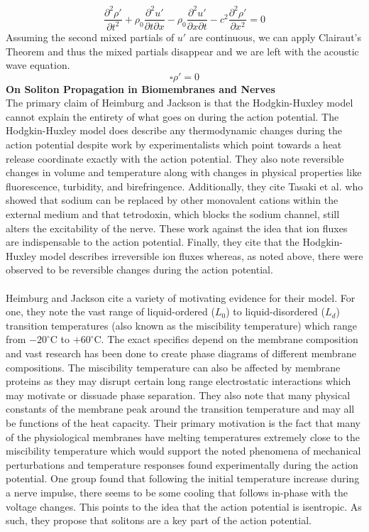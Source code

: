 \documentclass{article}
\newcommand{\pdt}[2]{\frac{\partial ^2 #1}{\partial #2 ^2}}
\newcommand{\pdm}[3]{\frac{\partial^2 #1}{\partial#2 \partial #3}}
\numberwithin{equation}{section}
\begin{document}
\begin{equation}
    \pdt{\rho'}{t} + \rho_0 \pdm{u'}{t}{x} - \rho_0 \pdm{u'}{x}{t} -c^2 \pdt{\rho ' }{x} = 0
\end{equation}
Assuming the second mixed partials of $u'$ are continuous, we can apply Clairaut's Theorem and thus the mixed partials disappear and we are left with the acoustic wave equation.
\begin{equation}
    \square \rho' = 0
\end{equation}
\textbf{On Soliton Propagation in Biomembranes and Nerves}\\
The primary claim of Heimburg and Jackson is that the Hodgkin-Huxley model cannot explain the entirety of what goes on during the action potential. The Hodgkin-Huxley model does describe any thermodynamic changes during the action potential despite work by experimentalists which point towards a heat release coordinate exactly with the action potential. They also note reversible changes in volume and temperature along with changes in physical properties like fluorescence, turbidity, and birefringence. Additionally, they cite Tasaki et al. who showed that sodium can be replaced by other monovalent cations within the external medium and that tetrodoxin, which blocks the sodium channel, still alters the excitability of the nerve. These work against the idea that ion fluxes are indispensable to the action potential. Finally, they cite that the Hodgkin-Huxley model describes irreversible ion fluxes whereas, as noted above, there were observed to be reversible changes during the action potential. \\\\
Heimburg and Jackson cite a variety of motivating evidence for their model. For one, they note the vast range of liquid-ordered ($L_0$) to liquid-disordered ($L_d$) transition temperatures (also known as the miscibility temperature) which range from $-20^\circ $C to $+60^\circ$C. The exact specifics depend on the membrane composition and vast research has been done to create phase diagrams of different membrane compositions. The miscibility temperature can also be affected by membrane proteins as they may disrupt certain long range electrostatic interactions which may motivate or dissuade phase separation. They also note that many physical constants of the membrane peak around the transition temperature and may all be functions of the heat capacity. Their primary motivation is the fact that many of the physiological membranes have melting temperatures extremely close to the miscibility temperature which would support the noted phenomena of mechanical perturbations and temperature responses found experimentally during the action potential. One group found that following the initial temperature increase during a nerve impulse, there seems to be some cooling that follows in-phase with the voltage changes. This points to the idea that the action potential is isentropic. As such, they propose that solitons are a key part of the action potential. \\\\
\end{document}
